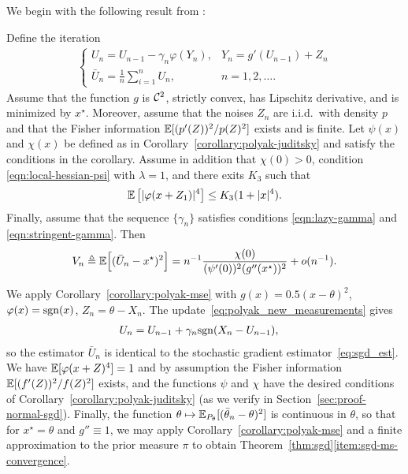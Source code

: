 We begin with the following result from \cite{polyak1990new}:
\begin{corollary}
  \label{corollary:polyak-mse}
  Define the iteration
  \begin{align} \label{eq:polyak_new_measurements}
    \begin{cases}
      U_n = U_{n-1} - \gamma_n \varphi(Y_n), & Y_n = g'(U_{n-1})+Z_n \\
      \bar{U}_n= \frac{1}{n} \sum_{i=1}^n U_n, & n=1,2,\ldots.
    \end{cases}
  \end{align}
  Assume that the function $g$ is $\mathcal{C}^2$, strictly convex, has Lipschitz
  derivative, and is minimized by $x^\star$. Moreover, assume that the
  noises $Z_n$ are i.i.d.\ with density $p$ and
  that the Fisher information $\mathbb{E}[(p'(Z))^2 / p(Z)^2]$ exists and is finite.
  Let $\psi(x)$ and $\chi(x)$ be defined as in
  Corollary~\ref{corollary:polyak-juditsky} and satisfy the conditions in
  the corollary. Assume in addition that $\chi(0)>0$, condition
  \eqref{eqn:local-hessian-psi} with $\lambda = 1$, and there exits $K_3$
  such that
  \begin{equation*}
    \mathbb{E}\left[   | \varphi(x+Z_1) |^4 \right] \leq K_3(1+|x|^4). 
  \end{equation*}
  Finally, assume that the sequence $\{\gamma_n \}$ satisfies conditions
  \eqref{eqn:lazy-gamma} and \eqref{eqn:stringent-gamma}. Then
  \begin{equation*}
    V_n \triangleq
    \mathbb{E}\Big[(\bar{U}_n-x^\star )^2\Big] = n^{-1}\frac{\chi(0)} {
      (\psi'(0))^2 (g''(x^\star))^2 } + o(n^{-1}).
  \end{equation*}
\end{corollary}

We apply Corollary~\ref{corollary:polyak-mse} with $g(x) = 0.5(x-\theta)^2$,
$\varphi(x) = \mathrm{sgn}(x)$, $Z_n = \theta-X_n$.
The update~\eqref{eq:polyak_new_measurements} gives
\begin{align*} 
  U_n %
  & = U_{n-1} + \gamma_n \sgn(X_n-U_{n-1} ),
\end{align*}
so the estimator $\bar{U}_n$ is identical to the stochastic gradient
estimator~\eqref{eq:sgd_est}. We have $\mathbb{E}[\varphi(x + Z)^4] = 1$ and by
assumption the Fisher information $\mathbb{E}[(f'(Z))^2 / f(Z)^2]$ exists, and the
functions $\psi$ and $\chi$ have the desired conditions of
Corollary~\ref{corollary:polyak-juditsky} (as we verify in
Section~\ref{sec:proof-normal-sgd}). Finally, the function $\theta \mapsto
\mathbb{E}_{P_\theta}[(\bar{\theta}_n - \theta)^2]$ is continuous in $\theta$, so
that for $x^\star = \theta$ and $g'' \equiv 1$, we may apply
Corollary~\ref{corollary:polyak-mse} and a finite approximation to the prior
measure $\pi$ to obtain
Theorem~\ref{thm:sgd}\eqref{item:sgd-ms-convergence}.

